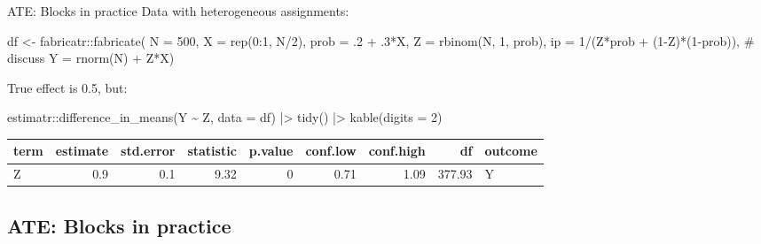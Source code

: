 \documentclass[
  11pt,
  ignorenonframetext,
]{beamer}
\newenvironment{Shaded}{\begin{snugshade}}{\end{snugshade}}
\newcommand{\AttributeTok}[1]{\textcolor[rgb]{0.40,0.45,0.13}{#1}}
\newcommand{\CommentTok}[1]{\textcolor[rgb]{0.37,0.37,0.37}{#1}}
\newcommand{\DecValTok}[1]{\textcolor[rgb]{0.68,0.00,0.00}{#1}}
\newcommand{\FunctionTok}[1]{\textcolor[rgb]{0.28,0.35,0.67}{#1}}
\newcommand{\NormalTok}[1]{\textcolor[rgb]{0.00,0.23,0.31}{#1}}
\newcommand{\OtherTok}[1]{\textcolor[rgb]{0.00,0.23,0.31}{#1}}
\newcommand{\SpecialCharTok}[1]{\textcolor[rgb]{0.37,0.37,0.37}{#1}}
\begin{document}
\begin{frame}[fragile]{ATE: Blocks in practice}
Data with heterogeneous assignments:

\begin{Shaded}
\begin{Highlighting}[]
\NormalTok{df }\OtherTok{\textless{}{-}}\NormalTok{ fabricatr}\SpecialCharTok{::}\FunctionTok{fabricate}\NormalTok{(}
  \AttributeTok{N =} \DecValTok{500}\NormalTok{, }\AttributeTok{X =} \FunctionTok{rep}\NormalTok{(}\DecValTok{0}\SpecialCharTok{:}\DecValTok{1}\NormalTok{, N}\SpecialCharTok{/}\DecValTok{2}\NormalTok{), }
  \AttributeTok{prob =}\NormalTok{ .}\DecValTok{2} \SpecialCharTok{+}\NormalTok{ .}\DecValTok{3}\SpecialCharTok{*}\NormalTok{X,}
  \AttributeTok{Z =} \FunctionTok{rbinom}\NormalTok{(N, }\DecValTok{1}\NormalTok{, prob),}
  \AttributeTok{ip =} \DecValTok{1}\SpecialCharTok{/}\NormalTok{(Z}\SpecialCharTok{*}\NormalTok{prob }\SpecialCharTok{+}\NormalTok{ (}\DecValTok{1}\SpecialCharTok{{-}}\NormalTok{Z)}\SpecialCharTok{*}\NormalTok{(}\DecValTok{1}\SpecialCharTok{{-}}\NormalTok{prob)), }\CommentTok{\# discuss}
  \AttributeTok{Y =} \FunctionTok{rnorm}\NormalTok{(N) }\SpecialCharTok{+}\NormalTok{ Z}\SpecialCharTok{*}\NormalTok{X)}
\end{Highlighting}
\end{Shaded}

True effect is 0.5, but:

\begin{Shaded}
\begin{Highlighting}[]
\NormalTok{estimatr}\SpecialCharTok{::}\FunctionTok{difference\_in\_means}\NormalTok{(Y }\SpecialCharTok{\textasciitilde{}}\NormalTok{ Z, }\AttributeTok{data =}\NormalTok{ df) }\SpecialCharTok{|\textgreater{}}
  \FunctionTok{tidy}\NormalTok{() }\SpecialCharTok{|\textgreater{}} \FunctionTok{kable}\NormalTok{(}\AttributeTok{digits =} \DecValTok{2}\NormalTok{)}
\end{Highlighting}
\end{Shaded}

\begin{tabular}{l|r|r|r|r|r|r|r|l}
\hline
term & estimate & std.error & statistic & p.value & conf.low & conf.high & df & outcome\\
\hline
Z & 0.9 & 0.1 & 9.32 & 0 & 0.71 & 1.09 & 377.93 & Y\\
\hline
\end{tabular}
\end{frame}

\hypertarget{ate-blocks-in-practice-1}{%
\subsection{ATE: Blocks in practice}\label{ate-blocks-in-practice-1}}
\end{document}
